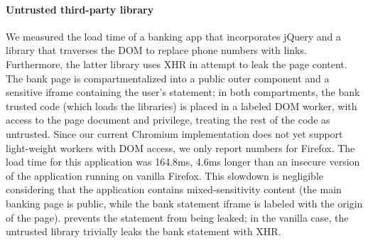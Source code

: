 \paragraph{Untrusted third-party library}

We measured the load time of a banking app that incorporates jQuery and
a library that traverses the DOM to replace phone numbers with links.
%
Furthermore, the latter library uses XHR in attempt to leak the page content.
%
The bank page is compartmentalized into a public outer component and
a sensitive iframe containing the user's statement;
in both compartments, the bank trusted code (which loads the libraries)
is placed in a labeled DOM worker, with access to the page document
and privilege, treating the rest of the code as untrusted.
%
Since our current Chromium implementation does not yet support
light-weight workers with DOM access, we only report numbers for
Firefox.
%
The load time for this application was 164.8ms, 4.6ms longer than an
insecure version of the application running on vanilla Firefox.
%
%
This slowdown is negligible considering that the
application contains mixed-sensitivity content (the main banking page
is public, while the bank statement iframe is labeled with the origin
of the page). \sys{} prevents the statement from being leaked; in the vanilla
case, the untrusted library trivially leaks the bank statement with
XHR\@.





